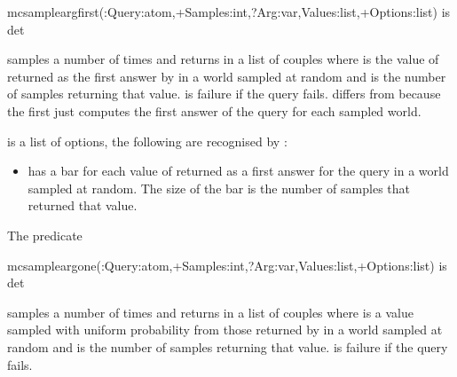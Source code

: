 \documentclass[letterpaper,10pt,english]{sphinxmanual}
\begin{document}
\begin{sphinxVerbatim}[commandchars=\\\{\}]
mc\PYGZus{}sample\PYGZus{}arg\PYGZus{}first(:Query:atom,+Samples:int,?Arg:var,\PYGZhy{}Values:list,+Options:list) is det
\end{sphinxVerbatim}

samples  a number of  times and returns in  a list of couples  where  is the value of  returned as the first answer by  in a world sampled at random and  is the number of samples returning that value.  is failure if the query fails.  differs from  because the first just computes the first answer of the query for each sampled world.

 is a list of options, the following are recognised by :
\begin{itemize}
\item {} 
  has a bar for each value of  returned as a first answer for the query in a world sampled at random. The size of the bar is the number of samples that returned that value.

\end{itemize}

The predicate

\begin{sphinxVerbatim}[commandchars=\\\{\}]
mc\PYGZus{}sample\PYGZus{}arg\PYGZus{}one(:Query:atom,+Samples:int,?Arg:var,\PYGZhy{}Values:list,+Options:list) is det
\end{sphinxVerbatim}

samples  a number of  times and returns in  a list of couples  where  is a value sampled with uniform probability from those returned by  in a world sampled at random and  is the number of samples returning that value.
 is failure if the query fails.
\end{document}
